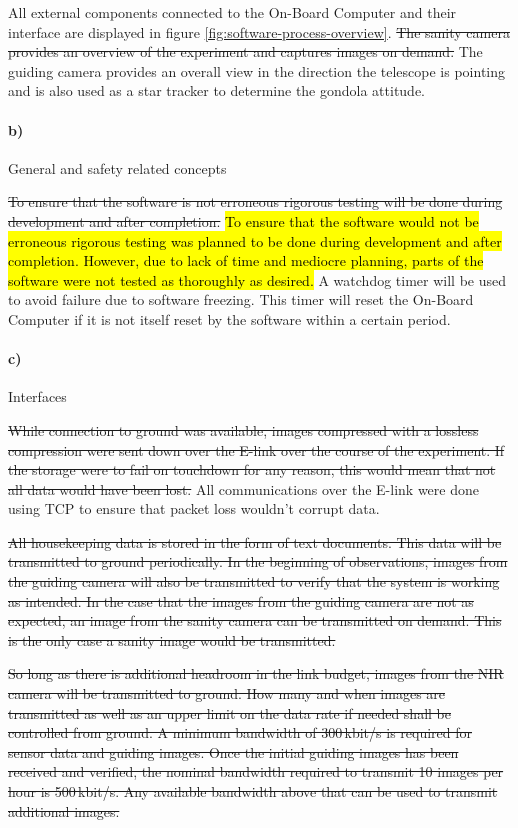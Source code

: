 All external components connected to the On-Board Computer and their interface are displayed in figure \ref{fig:software-process-overview}. \st{The sanity camera provides an overview of the experiment and captures images on demand.} The guiding camera provides an overall view in the direction the telescope is pointing and is also used as a star tracker to determine the gondola attitude.

\paragraph{b)} General and safety related concepts

\st{To ensure that the software is not erroneous rigorous testing will be done during development and after completion.} \hl{To ensure that the software would not be erroneous rigorous testing was planned to be done during development and after completion. However, due to lack of time and mediocre planning, parts of the software were not tested as thoroughly as desired.} A watchdog timer will be used to avoid failure due to software freezing. This timer will reset the On-Board Computer if it is not itself reset by the software within a certain period.

\paragraph{c)} Interfaces

\st{While connection to ground was available, images compressed with a lossless compression were sent down over the E-link over the course of the experiment. If the storage were to fail on touchdown for any reason, this would mean that not all data would have been lost.} All communications over the E-link were done using TCP to ensure that packet loss wouldn't corrupt data.



\st{All housekeeping data is stored in the form of text documents. This data will be transmitted to ground periodically. In the beginning of observations, images from the guiding camera will also be transmitted to verify that the system is working as intended. In the case that the images from the guiding camera are not as expected, an image from the sanity camera can be transmitted on demand. This is the only case a sanity image would be transmitted.}

\st{So long as there is additional headroom in the link budget, images from the NIR camera will be transmitted to ground. How many and when images are transmitted as well as an upper limit on the data rate if needed shall be controlled from ground. A minimum bandwidth of 300\,kbit/s is required for sensor data and guiding images. Once the initial guiding images has been received and verified, the nominal bandwidth required to transmit 10 images per hour is 500\,kbit/s. Any available bandwidth above that can be used to transmit additional images.}

